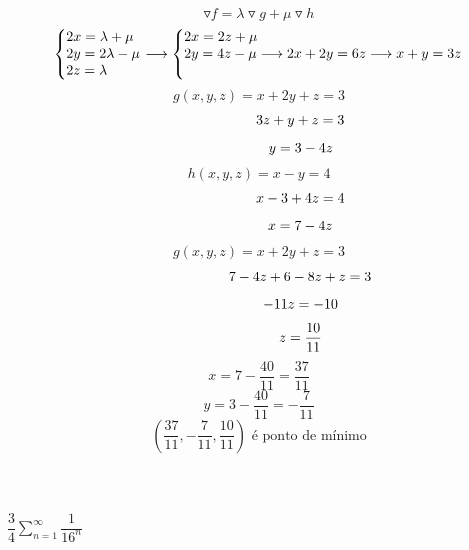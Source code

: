 \documentclass[12pt]{article}
\begin{document}
\[\triangledown f = \lambda \triangledown g + \mu \triangledown h\]
\[\left\{\begin{array}{@{}l@{}}
	2x = \lambda + \mu \\
	2y = 2\lambda - \mu \\
	2z = \lambda
\end{array} \right. \longrightarrow \left\{\begin{array}{@{}l@{}}
	2x = 2z + \mu \\
	2y = 4z - \mu \longrightarrow 2x + 2y = 6z \longrightarrow x+y=3z \\
	\
\end{array} \right.\]
\[g(x,y,z) = x+2y+z = 3\]
\[\hspace{+60pt} 3z+y+z = 3\]
\[\hspace{+60pt} y = 3-4z\]
\[h(x,y,z) = x-y = 4\]
\[\hspace{+60pt} x-3+4z = 4\]
\[\hspace{+60pt} x = 7-4z\]
\[g(x,y,z) = x+2y+z = 3\]
\[\hspace{+60pt} 7-4z+6-8z+z = 3\]
\[\hspace{+60pt} -11z = -10\]
\[\hspace{+60pt} z = \dfrac{10}{11}\]
\[x = 7 - \dfrac{40}{11} = \dfrac{37}{11}\]
\[y = 3 - \dfrac{40}{11} = -\dfrac{7}{11}\]
\[\left( \dfrac{37}{11}, -\dfrac{7}{11}, \dfrac{10}{11} \right) \text{ é ponto de mínimo}\]
\\\\\\
$\dfrac{3}{4} \displaystyle \sum_{n=1}^{\infty} \dfrac{1}{16^{n}}$
\end{document}
